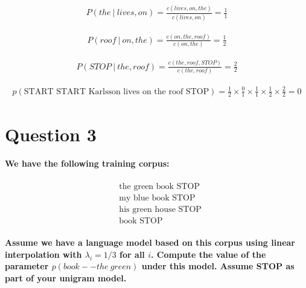 \documentclass{article}
\newcommand\given[1][]{\:#1\vert\:}
\begin{document}
\begin{equation*}
    \begin{split}
    P(the \given lives, on) = \frac{c(lives, on, the)}{ c(lives, on)} = \frac{1}{1}
    \end{split}
\end{equation*}

\begin{equation*}
    \begin{split}
    P(roof \given on, the) = \frac{c(on, the, roof)}{ c(on, the)} = \frac{1}{2}
    \end{split}
\end{equation*}

\begin{equation*}
    \begin{split}
    P(STOP \given the, roof) = \frac{c(the, roof, STOP)}{ c(the, roof)} = \frac{2}{2}
    \end{split}
\end{equation*}


\begin{equation*}
    \begin{split}
    p(\text{START START Karlsson lives on the roof STOP}) = \frac{1}{2} \times \frac{0}{1} \times \frac{1}{1} \times \frac{1}{2} \times \frac{2}{2} = 0
    \end{split}
\end{equation*}






\clearpage

\section*{Question 3}
\paragraph{We have the following training corpus:}

\begin{equation*}
    \begin{split}
    &\text{the green book STOP}\\
    &\text{my blue book STOP}\\
    &\text{his green house STOP}\\
    &\text{book STOP}
    \end{split}
\end{equation*}


\paragraph{Assume we have a language model based on this corpus using linear interpolation with $\lambda_i = 1 / 3$ for all $i$. Compute the value of the parameter $p(book--the\ green)$ under this model. Assume STOP as part of your unigram model.}
\end{document}
